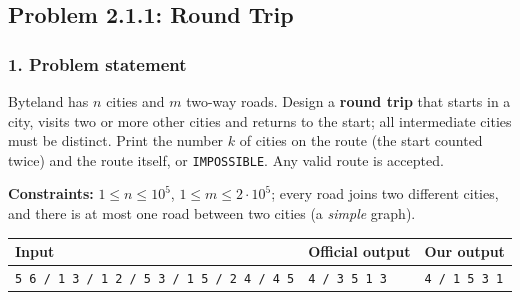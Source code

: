 \subsection{Problem 2.1.1: Round Trip}


\subsubsection*{1. Problem statement}

Byteland has $n$ cities and $m$ two-way roads. Design a \textbf{round trip} that starts in a city, visits two or more other cities and returns to the start; all intermediate cities must be distinct. Print the number $k$ of cities on the route (the start counted twice) and the route itself, or \texttt{IMPOSSIBLE}. Any valid route is accepted.

\textbf{Constraints:} $1 \le n \le 10^5$, $1 \le m \le 2 \cdot 10^5$; every road joins two different cities, and there is at most one road between two cities (a \emph{simple} graph).

\begin{table}[H]
\centering\small
\begin{tabular}{@{}lll@{}}
\toprule
\textbf{Input} & \textbf{Official output} & \textbf{Our output} \\
\midrule
\texttt{5 6 / 1 3 / 1 2 / 5 3 / 1 5 / 2 4 / 4 5} & \texttt{4 / 3 5 1 3} & \texttt{4 / 1 5 3 1} \\
\bottomrule
\end{tabular}
\end{table}


